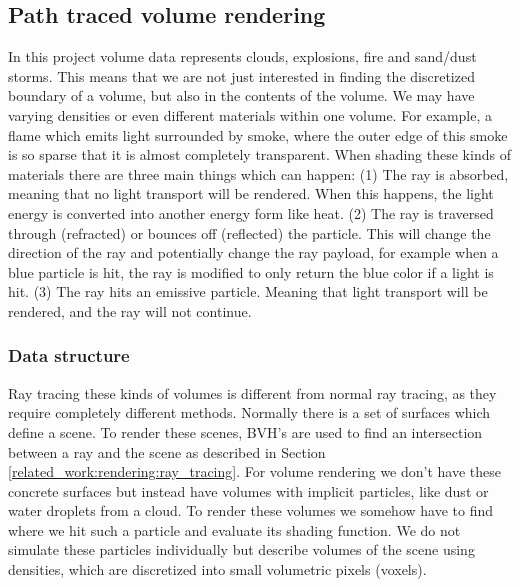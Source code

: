 \subsection{Path traced volume rendering} \label{related_work:path_traced_volume_rendering}
In this project volume data represents clouds, explosions, fire and sand/dust storms. This means that we are not just interested in finding the discretized boundary of a volume, but also in the contents of the volume. We may have varying densities or even different materials within one volume. For example, a flame which emits light surrounded by smoke, where the outer edge of this smoke is so sparse that it is almost completely transparent. When shading these kinds of materials there are three main things which can happen: (1) The ray is absorbed, meaning that no light transport will be rendered. When this happens, the light energy is converted into another energy form like heat. (2) The ray is traversed through (refracted) or bounces off (reflected) the particle. This will change the direction of the ray and potentially change the ray payload, for example when a blue particle is hit, the ray is modified to only return the blue color if a light is hit. (3) The ray hits an emissive particle. Meaning that light transport will be rendered, and the ray will not continue.

\subsubsection{Data structure} \label{related_work:path_traced_volume_rendering:data_structure}
Ray tracing these kinds of volumes is different from normal ray tracing, as they require completely different methods. Normally there is a set of surfaces which define a scene. To render these scenes, BVH's are used to find an intersection between a ray and the scene as described in Section \ref{related_work:rendering:ray_tracing}. For volume rendering we don't have these concrete surfaces but instead have volumes with implicit particles, like dust or water droplets from a cloud. To render these volumes we somehow have to find where we hit such a particle and evaluate its shading function. We do not simulate these particles individually but describe volumes of the scene using densities, which are discretized into small volumetric pixels (voxels).

